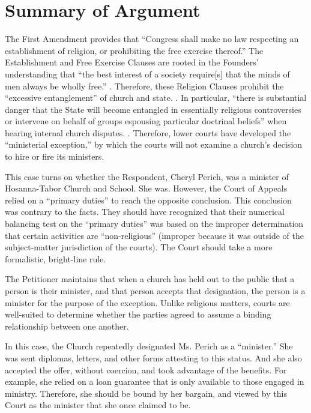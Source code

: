 \documentclass[12pt,\documentclassflag]{FRAP_Brief}
\begin{document}
\section{Summary of Argument}

The First Amendment provides that ``Congress shall make no law respecting an establishment of religion, or prohibiting the free exercise thereof.'' The Establishment and Free Exercise Clauses are rooted in the Founders' understanding that ``the best interest of a society require[s] that the minds of men always be wholly free.'' . Therefore, these Religion Clauses prohibit the ``excessive entanglement'' of church and state.  \See {}. In particular, ``there is substantial danger that the State will become entangled in essentially religious controversies or intervene on behalf of groups espousing particular doctrinal beliefs'' when hearing internal church disputes. . Therefore, lower courts have developed the ``ministerial exception,'' by which the courts will not examine a church's decision to hire or fire its ministers.  

This case turns on whether the Respondent, Cheryl Perich, was a minister of Hosanna-Tabor Church and School. She was. However, the Court of Appeals relied on a ``primary duties'' to reach the opposite conclusion. This conclusion was contrary to the facts. They should have recognized that their numerical balancing test on the ``primary duties'' was based on the improper determination that certain activities are ``non-religious'' (improper because it was outside of the subject-matter jurisdiction of the courts). The Court should take a more formalistic, bright-line rule. 

The Petitioner maintains that when a church has held out to the public that a person is their minister, and that person accepts that designation, the person is a minister for the purpose of the exception. Unlike religious matters, courts are well-suited to determine whether the parties agreed to assume a binding relationship between one another.	

In this case, the Church repeatedly designated Ms. Perich as a ``minister.'' She was sent diplomas, letters, and other forms attesting to this status. And she also accepted the offer, without coercion, and took advantage of the benefits. For example, she relied on a loan guarantee that is only available to those engaged in ministry. Therefore, she should be bound by her bargain, and viewed by this Court as the minister that she once claimed to be.
\end{document}
